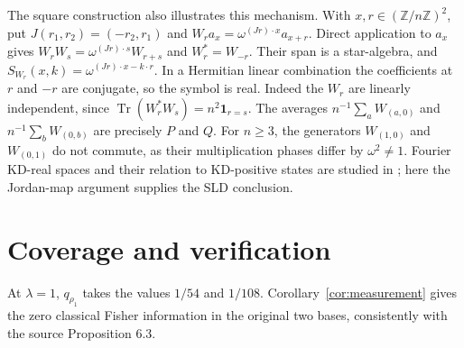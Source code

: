 \documentclass[11pt]{article}
\newcommand{\Tr}{\operatorname{Tr}}
\begin{document}
The square construction also illustrates this mechanism. With
$x,r\in(\mathbb Z/n\mathbb Z)^2$, put $J(r_1,r_2)=(-r_2,r_1)$ and
$W_ra_x=\omega^{(Jr)\cdot x}a_{x+r}$. Direct application to $a_x$ gives
$W_rW_s=\omega^{(Jr)\cdot s}W_{r+s}$ and $W_r^*=W_{-r}$.
Their span is a star-algebra, and
$S_{W_r}(x,k)=\omega^{(Jr)\cdot x-k\cdot r}$.
In a Hermitian linear combination the coefficients at $r$ and $-r$
are conjugate, so the symbol is real. Indeed the $W_r$ are linearly
independent, since $\Tr(W_r^*W_s)=n^2\mathbf1_{r=s}$.
The averages $n^{-1}\sum_aW_{(a,0)}$ and
$n^{-1}\sum_bW_{(0,b)}$ are precisely $P$ and $Q$.
For $n\ge3$, the generators $W_{(1,0)}$ and $W_{(0,1)}$ do not commute,
as their multiplication phases differ by $\omega^2\ne1$.
Fourier KD-real spaces and their relation to KD-positive states are studied
in \cite{fourier}; here the Jordan-map argument supplies the SLD conclusion.

\section{Coverage and verification}
At $\lambda=1$, $q_{\rho_1}$ takes the values $1/54$ and $1/108$.
Corollary~\ref{cor:measurement} gives the zero classical Fisher information
in the original two bases, consistently with the source Proposition 6.3.
\end{document}

